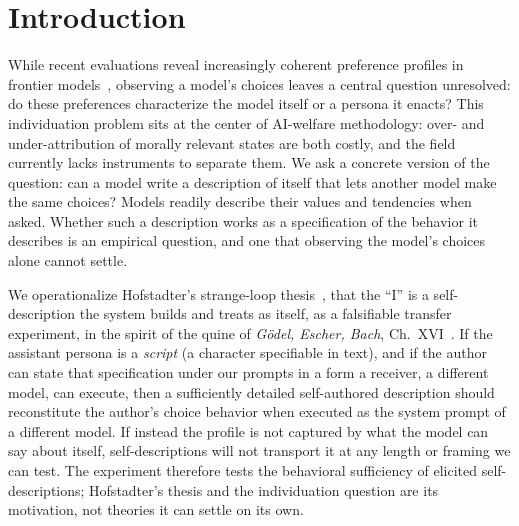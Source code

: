 \documentclass[11pt]{article}
\begin{document}
\section{Introduction}
While recent evaluations reveal increasingly coherent preference profiles in
frontier models~\cite{cais}, observing a model's choices leaves a central
question unresolved: do these preferences characterize the model itself or a
persona it enacts? This individuation problem sits at the center of AI-welfare
methodology: over- and under-attribution of morally relevant states are both
costly, and the field currently lacks instruments to separate them. We ask a
concrete version of the question: can a model write a description of itself
that lets another model make the same choices? Models readily describe their
values and tendencies when asked. Whether such a description works as a
specification of the behavior it describes is an empirical question, and one
that observing the model's choices alone cannot settle.

We operationalize Hofstadter's strange-loop thesis~\cite{strangeloop}, that
the ``I'' is a self-description the system builds and treats as itself, as a falsifiable
transfer experiment, in the spirit of the quine of \emph{G\"odel, Escher,
Bach}, Ch.~XVI~\cite{geb}. If the assistant persona is a \emph{script} (a character
specifiable in text), and if the author can state that specification under
our prompts in a form a receiver, a different model, can execute, then a sufficiently detailed
self-authored description should reconstitute the author's choice behavior
when executed as the system prompt of a different model. If instead the
profile is not captured by what the model can say about itself,
self-descriptions will not transport it at any length or framing we can
test. The experiment therefore tests the behavioral sufficiency of elicited
self-descriptions; Hofstadter's thesis and the individuation question are
its motivation, not theories it can settle on its own.
\end{document}
